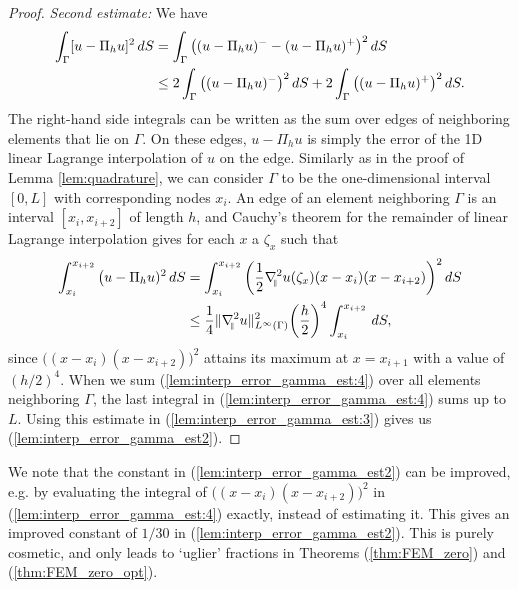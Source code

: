 \documentclass{article}
\theoremstyle{remark}
\def \d {{\rm d}}
\def\dS{\,\d S }
\def\gradt{\nabla_{\!\!{\scriptscriptstyle\parallel}}}
\begin{document}
\begin{proof}
\medskip
\textit{Second estimate:} 
We have
\begin{equation}
\begin{split}
\label{lem:interp_error_gamma_est:3}
\int_\Gamma[u-\Pi_h u]^2\dS &=\int_\Gamma\big((u-\Pi_h u)^--(u-\Pi_h u)^+\big)^2\dS\\
&\leq 2\int_\Gamma\big((u-\Pi_h u)^-\big)^2\dS +2\int_\Gamma\big((u-\Pi_h u)^+\big)^2\dS.
\end{split}
\end{equation}
The right-hand side integrals can be written as the sum over edges of neighboring elements that lie on $\Gamma$. On these edges, $u-\Pi_h u$ is simply the error of the 1D linear Lagrange interpolation of $u$ on the edge. Similarly as in the proof of Lemma \ref{lem:quadrature}, we can consider $\Gamma$ to be the one-dimensional interval $[0,L]$ with corresponding nodes $x_i$. An edge of an element neighboring $\Gamma$ is an interval $[x_i,x_{i+2}]$ of length $h$, and Cauchy's theorem for the remainder of linear Lagrange interpolation gives for each $x$ a $\zeta_x$ such that
\begin{equation}
\begin{split}
\label{lem:interp_error_gamma_est:4}
\int_{x_i}^{x_{i+2}}\big(u-\Pi_h u)^2\dS &= \int_{x_i}^{x_{i+2}} \bigg(\frac{1}{2} \gradt^2 u(\zeta_x) (x-x_{i})(x-x_{i+2})\bigg)^2\dS\\
&\leq \frac{1}{4} \|\gradt^2 u\|_{L^\infty(\Gamma)}^2 \bigg(\frac{h}{2}\bigg)^4 \int_{x_i}^{x_{i+2}} \dS,
\end{split}
\end{equation}
since $\big((x-x_{i})(x-x_{i+2})\big)^2$ attains its maximum at $x=x_{i+1}$ with a value of $(h/2)^4$. When we sum (\ref{lem:interp_error_gamma_est:4}) over all elements neighboring $\Gamma$, the last integral in (\ref{lem:interp_error_gamma_est:4}) sums up to $L$. Using this estimate in (\ref{lem:interp_error_gamma_est:3}) gives us (\ref{lem:interp_error_gamma_est2}).
\end{proof}

We note that the constant in (\ref{lem:interp_error_gamma_est2}) can be improved, e.g. by evaluating the integral of $\big((x-x_{i})(x-x_{i+2})\big)^2$ in (\ref{lem:interp_error_gamma_est:4}) exactly, instead of estimating it. This gives an improved constant of $1/30$ in  (\ref{lem:interp_error_gamma_est2}). This is purely cosmetic, and only leads to `uglier' fractions in Theorems (\ref{thm:FEM_zero}) and (\ref{thm:FEM_zero_opt}).
\end{document}
